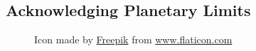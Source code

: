 \subsection{Acknowledging Planetary Limits}
\label{subsec:introduction_principles_acknowledging_planetary_limits}

\begin{figure} %
  \centering
  \def\stackalignment{l} %
  {\scriptsize \parbox[t]{\linewidth}{ Icon made by \href{https://www.flaticon.com/authors/freepik}{Freepik} from \href{http://www.flaticon.com}{www.flaticon.com} }}
\end{figure}

